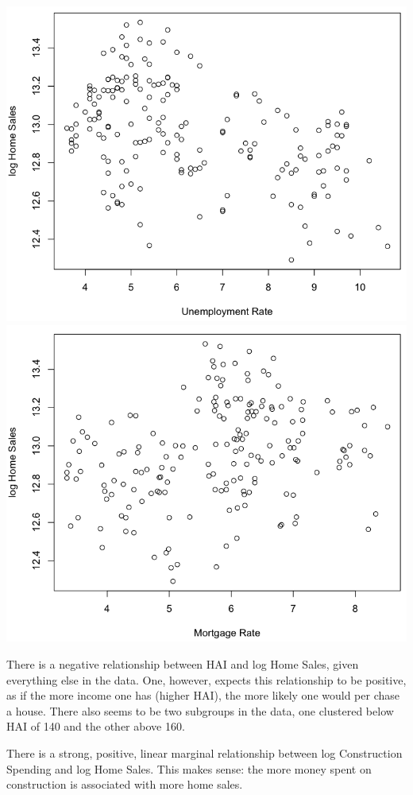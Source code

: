 \documentclass[a4 paper, 11 pt]{article}
\begin{document}
\begin{center}
\includegraphics[scale=0.3]{unrate}
\includegraphics[scale=0.3]{mort}
\end{center}
There is a negative relationship between HAI and log Home Sales, given everything else in the data. One, however, expects this relationship to be positive, as if the more income one has (higher HAI), the more likely one would per chase a house. There also seems to be two subgroups in the data, one clustered below HAI of 140 and the other above 160.

There is a strong, positive, linear marginal relationship between log Construction Spending and log Home Sales. This makes sense: the more money spent on construction is associated with more home sales.
\end{document}
